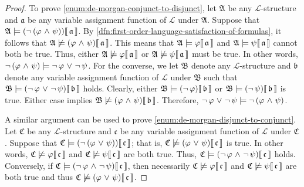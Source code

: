 \begin{proof}
    To prove \ref{enum:de-morgan-conjunct-to-disjunct}, let \( \mathfrak{A} \) be any \( \mathcal{L} \)-structure and
    \( \mathfrak{a} \) be any variable assignment function of \( \mathcal{L} \)
    under \( \mathfrak{A} \). Suppose that \( \folwffsatisfaction{\mathfrak{A}}{\mleft( \lnot \, \mleft( \varphi \,\,{\land}\,\, \psi \mright) \mright)}{\mathfrak{a}} \).
    By \cref{dfn:first-order-language-satisfaction-of-formulas}, it follows that \( \folwffnonsatisfaction{\mathfrak{A}}{\mleft( \varphi \,\,{\land}\,\, \psi \mright)}{\mathfrak{a}} \). This means that \(  \mathfrak{A} \models \varphi\llbracket\, \mathfrak{a} \,\rrbracket \) and \(  \mathfrak{A} \models \psi\llbracket\, \mathfrak{a} \,\rrbracket \) cannot both be true.
    Thus, either \(  \mathfrak{A} \not\models \varphi\llbracket\,\mathfrak{a} \,\rrbracket \) or \(  \mathfrak{A} \not\models \psi\llbracket\,\mathfrak{a} \,\rrbracket \) must be true.
    In other words, \( \lnot \, \mleft( \varphi \,\,{\land}\,\, \psi \mright) \models \lnot \, \varphi \,\,{\lor}\,\, \lnot \, \psi \).
    For the converse, we let \( \mathfrak{B} \) denote any \( \mathcal{L} \)-structure and \( \mathfrak{b} \) denote any variable assignment function of \( \mathcal{L} \)
    under \( \mathfrak{B} \) such that \( \folwffsatisfaction{\mathfrak{B}}{\mleft( \lnot \, \varphi \,\,{\lor}\,\, \lnot \, \psi \mright)}{\mathfrak{b}} \) holds.
    Clearly, either \( \folwffsatisfaction{\mathfrak{B}}{\mleft( \lnot \, \varphi \mright)}{\mathfrak{b}} \)
    or \( \folwffsatisfaction{\mathfrak{B}}{ \mleft( \lnot \, \psi \mright) }{\mathfrak{b}} \) is true.
    Either case implies \( \folwffnonsatisfaction{\mathfrak{B}}{\mleft( \varphi \,\,{\land}\,\, \psi \mright)}{\mathfrak{b}} \).
    Therefore, \( \lnot \, \varphi \,\,{\lor}\,\, \lnot \, \psi \models \lnot \, \mleft( \varphi \,\,{\land}\,\, \psi \mright) \).

    \vspace{0.3cm}
    \noindent
    A similar argument can be used to prove \ref{enum:de-morgan-disjunct-to-conjunct}.
    Let \( \mathfrak{C} \) be any \( \mathcal{L} \)-structure and \( \mathfrak{c} \) be any variable assignment function of \( \mathcal{L} \) under \( \mathfrak{C} \).
    Suppose that \( \folwffsatisfaction{\mathfrak{C}}{\mleft( \lnot \, \mleft( \varphi \,\,{\lor}\,\, \psi \mright) \mright)}{\mathfrak{c}} \);
    that is, \( \folwffnonsatisfaction{\mathfrak{C}}{\mleft( \varphi \,\,{\lor}\,\, \psi \mright)}{\mathfrak{c}} \) is true.
    In other words, \(  \mathfrak{C} \not\models \varphi\llbracket\,\mathfrak{c} \,\rrbracket \) and \(  \mathfrak{C} \not\models \psi\llbracket\,\mathfrak{c} \,\rrbracket \) are both true.
    Thus, \( \folwffsatisfaction{\mathfrak{C}}{\mleft( \lnot \, \varphi \,\,{\land}\,\, \lnot \, \psi \mright)}{\mathfrak{c}} \) holds.
    Conversely, if \( \folwffsatisfaction{\mathfrak{C}}{\mleft( \lnot \, \varphi \,\,{\land}\,\, \lnot \, \psi \mright)}{\mathfrak{c}} \),
    then necessarily \(  \mathfrak{C} \not\models \varphi\llbracket\,\mathfrak{c} \,\rrbracket \) and \(  \mathfrak{C} \not\models \psi\llbracket\,\mathfrak{c} \,\rrbracket \) are both true
    and thus \( \folwffnonsatisfaction{\mathfrak{C}}{\mleft( \varphi \,\,{\lor}\,\, \psi \mright)}{\mathfrak{c}} \).
\end{proof}

